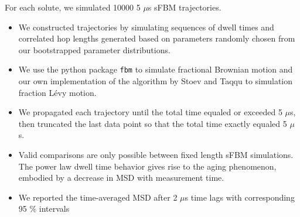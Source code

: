\documentclass{article}
\begin{document}
  \noindent For each solute, we simulated 10000 5 $\mu$s sFBM trajectories. 
  \begin{itemize}
	\item We constructed trajectories by simulating	sequences of dwell times and correlated 
	hop	lengths generated based on parameters randomly chosen from our bootstrapped parameter
	distributions.
	\item We use the python package \texttt{fbm} to simulate fractional Brownian motion and 
	our own implementation of the algorithm by Stoev and Taqqu to simulation fraction L\'evy motion.~\cite{stoev_simulation_2004}
	\item We propagated each trajectory until the total time equaled or exceeded 5 $\mu$s, 
	then truncated the last data point so that the total time exactly equaled 5 $\mu$s. 
    \item Valid comparisons are only possible between fixed length sFBM simulations. The
    power law dwell time behavior gives rise to the aging phenomenon, embodied by
    a decrease in MSD with measurement time.~\cite{neusius_subdiffusion_2008,metzler_anomalous_2014}
    \item We reported the time-averaged MSD after 2 $\mu$s time lags with corresponding 
    95 \% intervals
  \end{itemize}
\end{document}
